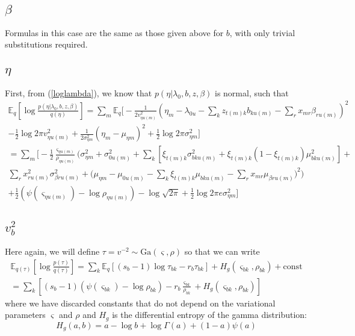\documentclass[11pt]{article}
\begin{document}
\subsection{$\beta$}
Formulas in this case are the same as those given above for $b$, with only trivial substitutions required.

\subsection{$\eta$}
First, from (\ref{loglambda}), we know that $p(\eta|\lambda_0, b, z, \beta)$ is normal, such that
\begin{multline}
    \mathbb{E}_{q}\left[ \log \frac{p(\eta|\lambda_0, b, z, \beta)}{q(\eta)}\right] = 
    \sum_m \mathbb{E}_q \Bigg[
    -\frac{1}{2 v^2_{\eta u(m)}} 
        \left(
        \eta_m - \lambda_{0u} - \sum_k z_{t(m) k} b_{k u(m)} - 
        \sum_r x_{mr} \beta_{r u(m)} 
        \right)^2  \\
    -\frac{1}{2} \log 2\pi v^2_{\eta u(m)}
    + \frac{1}{2\sigma^2_{\eta m}} (\eta_m - \mu_{\eta m})^2 + 
    \frac{1}{2} \log 2\pi \sigma^2_{\eta m}
    \Bigg] \\
    = \sum_m \Bigg[ -\frac{1}{2}\frac{\varsigma_{\eta u(m)}}{\rho_{\eta u(m)}} 
    \Bigg(
        \sigma^2_{\eta m} + \sigma^2_{0 u(m)} + 
        \sum_k \left[ \xi_{t(m) k} \sigma^2_{b k u(m)} +
        \xi_{t(m) k} (1 - \xi_{t(m) k}) \mu^2_{bk u(m)}\right] + \\
        \sum_r x^2_{r u(m)} \sigma^2_{\beta r u(m)}
    +
    \Big(
    \mu_{\eta m} - \mu_{0 u(m)} - \sum_k \xi_{t(m) k} \mu_{b k u(m)} 
    - \sum_r x_{mr} \mu_{\beta r u(m)}
    \Big)^2 \Bigg)  \\
    + \frac{1}{2}(\psi(\varsigma_{\eta u(m)}) - \log \rho_{\eta u(m)}) - \log \sqrt{2\pi}
    + \frac{1}{2} \log 2\pi e \sigma^2_{\eta m}
    \Bigg]
\end{multline}

\subsection{$v^2_b$}
Here again, we will define $\tau = v^{-2} \sim \mathrm{Ga}(\varsigma, \rho)$ so that we can write
\begin{multline}
    \mathbb{E}_{q(\tau)}\left[\log \frac{p(\tau)}{q(\tau)}\right] =
    \sum_k \mathbb{E}_q \left[
    (s_{b} - 1) \log \tau_{bk} - r_{b} \tau_{bk} \right]  
    + H_g(\varsigma_{bk}, \rho_{bk})    
    + \mathrm{const} \\
    = \sum_k \left[ 
    (s_{b} - 1) (\psi(\varsigma_{bk}) - \log \rho_{bk}) 
    - r_{b} \frac{\varsigma_{bk}}{\rho_{bk}} + H_g(\varsigma_{bk}, \rho_{bk})
    \right]
\end{multline}
where we have discarded constants that do not depend on the variational parameters $\varsigma$ and $\rho$ and $H_g$ is the differential entropy of the gamma distribution:
\begin{equation}
    H_g(a, b) = a - \log b + \log \Gamma(a) + (1 - a)\psi(a)
\end{equation}
\end{document}
